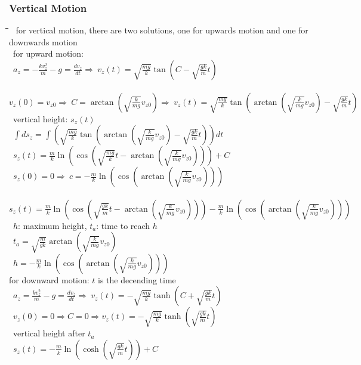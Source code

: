 \documentclass[10pt,letterpaper]{scrartcl}
\newcommand{\tbul}{\textbullet}
\newcommand{\tend}{\>\textendash}
\newcommand{\tabDef}{\hspace{2em}\=\hspace{2em}\=\hspace{2em}\=\hspace{2em}\=\kill}
\begin{document}
\subsubsection*{Vertical Motion}\begin{tabbing}\tabDef
\tbul\ for vertical motion, there are two solutions, one for upwards motion and one for downwards motion \\
\tbul\ for upward motion: \\
\>\>\ $\displaystyle a_z = -\frac{kv^2_z}{m} - g = \frac{dv_z}{dt}\Rightarrow\ v_z(t) = \sqrt{\frac{mg}{k}}\tan(C - \sqrt{\frac{gk}{m}}t)$ \\
\>\>\ $\displaystyle v_z(0) = v_{z0}\Rightarrow\ C = \arctan(\sqrt{\frac{k}{mg}}v_{z0})\Rightarrow\ v_z(t) = \sqrt{\frac{mg}{k}}\tan(\arctan(\sqrt{\frac{k}{mg}}v_{z0})-\sqrt{\frac{gk}{m}}t)$\\
\tend\ vertical height: $s_z(t)$ \\
\>\>\ $\displaystyle \int ds_z = \int (\sqrt{\frac{mg}{k}}\tan(\arctan(\sqrt{\frac{k}{mg}}v_{z0})-\sqrt{\frac{gk}{m}}t))dt$\\
\>\>\ $\displaystyle s_z(t) = \frac{m}{k}\ln(\cos(\sqrt{\frac{mg}{k}}t-\arctan(\sqrt{\frac{k}{mg}}v_{z0})))+C$ \\
\>\>\ $\displaystyle s_z(0) = 0\Rightarrow\ c = - \frac{m}{k}\ln(\cos(\arctan(\sqrt{\frac{k}{mg}}v_{z0})))$ \\
\>\>\ $\displaystyle s_z(t) = \frac{m}{k}\ln(\cos(\sqrt{\frac{gk}{m}}t-\arctan(\sqrt{\frac{k}{mg}}v_{z0})))-\frac{m}{k}\ln(\cos(\arctan(\sqrt{\frac{k}{mg}}v_{z0})))$ \\
\tend\ $h$: maximum height, $t_a$: time to reach $h$ \\
\>\>\ $\displaystyle t_a = \sqrt{\frac{m}{gk}}\arctan(\sqrt{\frac{k}{mg}}v_{z0})$ \\
\>\>\ $\displaystyle h = -\frac{m}{k}\ln(\cos(\arctan(\sqrt{\frac{k}{mg}}v_{z0})))$ \\
\tbul for downward motion: $t$ is the decending time \\
\>\>\ $\displaystyle a_z = \frac{kv^2_z}{m}-g = \frac{dv_z}{dt}\Rightarrow\ v_z(t) = -\sqrt{\frac{mg}{k}}\tanh(C+\sqrt{\frac{gk}{m}}t)$ \\
\>\>\ $\displaystyle v_z(0) = 0\Rightarrow C = 0\Rightarrow v_z(t)=-\sqrt{\frac{mg}{k}}\tanh(\sqrt{\frac{gk}{m}}t)$ \\
\tend\ vertical height after $t_a$ \\
\>\>\ $\displaystyle s_z(t) = -\frac{m}{k}\ln(\cosh(\sqrt{\frac{gk}{m}}t))+ C$ \\

\end{tabbing}
\end{document}
